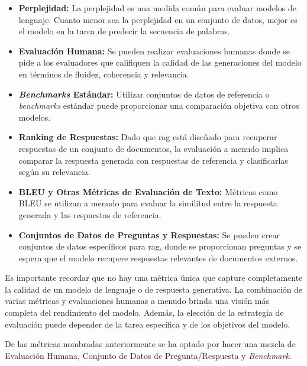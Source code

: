 \begin{itemize}

\item \textbf{Perplejidad:} La perplejidad es una medida común para evaluar modelos de lenguaje. Cuanto menor sea la perplejidad en un conjunto de datos, mejor es el modelo en la tarea de predecir la secuencia de palabras.

\item \textbf{Evaluación Humana:} Se pueden realizar evaluaciones humanas donde se pide a los evaluadores que califiquen la calidad de las generaciones del modelo en términos de fluidez, coherencia y relevancia.

\item \textbf{\textit{Benchmarks} Estándar:} Utilizar conjuntos de datos de referencia o \textit{benchmarks} estándar puede proporcionar una comparación objetiva con otros modelos.

\item \textbf{Ranking de Respuestas:} Dado que \acrshort{rag} está diseñado para recuperar respuestas de un conjunto de documentos, la evaluación a menudo implica comparar la respuesta generada con respuestas de referencia y clasificarlas según su relevancia.

\item \textbf{BLEU y Otras Métricas de Evaluación de Texto:} Métricas como BLEU se utilizan a menudo para evaluar la similitud entre la respuesta generada y las respuestas de referencia.

\item \textbf{Conjuntos de Datos de Preguntas y Respuestas:} Se pueden crear conjuntos de datos específicos para \acrshort{rag}, donde se proporcionan preguntas y se espera que el modelo recupere respuestas relevantes de documentos externos.

\end{itemize}

Es importante recordar que no hay una métrica única que capture completamente la calidad de un modelo de lenguaje o de respuesta generativa. La combinación de varias métricas y evaluaciones humanas a menudo brinda una visión más completa del rendimiento del modelo. Además, la elección de la estrategia de evaluación puede depender de la tarea específica y de los objetivos del modelo.

De las métricas nombradas anteriormente se ha optado por hacer una mezcla de Evaluación Humana, Conjunto de Datos de Pregunta/Respuesta y \textit{Benchmark}. 

